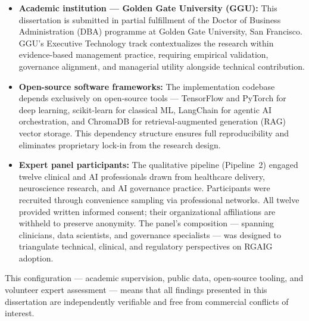 \begin{itemize}[leftmargin=*, itemsep=3pt]
    \item \textbf{Academic institution --- Golden Gate University (GGU):} This dissertation is submitted in partial fulfillment of the Doctor of Business Administration (DBA) programme at Golden Gate University, San Francisco. GGU's Executive Technology track contextualizes the research within evidence-based management practice, requiring empirical validation, governance alignment, and managerial utility alongside technical contribution.

    \item \textbf{Open-source software frameworks:} The implementation codebase depends exclusively on open-source tools --- TensorFlow and PyTorch for deep learning, scikit-learn for classical ML, LangChain for agentic AI orchestration, and ChromaDB for retrieval-augmented generation (RAG) vector storage. This dependency structure ensures full reproducibility and eliminates proprietary lock-in from the research design.

    \item \textbf{Expert panel participants:} The qualitative pipeline (Pipeline~2) engaged twelve clinical and AI professionals drawn from healthcare delivery, neuroscience research, and AI governance practice. Participants were recruited through convenience sampling via professional networks. All twelve provided written informed consent; their organizational affiliations are withheld to preserve anonymity. The panel's composition --- spanning clinicians, data scientists, and governance specialists --- was designed to triangulate technical, clinical, and regulatory perspectives on RGAIG adoption.
\end{itemize}


\noindent This configuration --- academic supervision, public data, open-source tooling, and volunteer expert assessment --- means that all findings presented in this dissertation are independently verifiable and free from commercial conflicts of interest.

